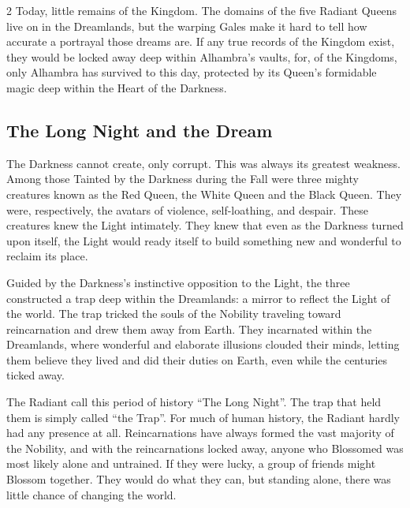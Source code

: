 \begin{multicols}{2}
Today, little remains of the Kingdom. The domains of the five Radiant Queens live on in the Dreamlands, but the warping Gales make it hard to tell how accurate a portrayal those dreams are. If any true records of the Kingdom exist, they would be locked away deep within Alhambra's vaults, for, of the Kingdoms, only Alhambra has survived to this day, protected by its Queen's formidable magic deep within the Heart of the Darkness. 

\subsection*{The Long Night and the Dream}%

The Darkness cannot create, only corrupt. This was always its greatest weakness. Among those Tainted by the Darkness during the Fall were three mighty creatures known as the Red Queen, the White Queen and the Black Queen. They were, respectively, the avatars of violence, self-loathing, and despair. These creatures knew the Light intimately. They knew that even as the Darkness turned upon itself, the Light would ready itself to build something new and wonderful to reclaim its place.

Guided by the Darkness's instinctive opposition to the Light, the three constructed a trap deep within the Dreamlands: a mirror to reflect the Light of the world. The trap tricked the souls of the Nobility traveling toward reincarnation and drew them away from Earth. They incarnated within the Dreamlands, where wonderful and elaborate illusions clouded their minds, letting them believe they lived and did their duties on Earth, even while the centuries ticked away.

The Radiant call this period of history \textquotedblleft The Long Night\textquotedblright. The trap that held them is simply called \textquotedblleft the Trap\textquotedblright. For much of human history, the Radiant hardly had any presence at all. Reincarnations have always formed the vast majority of the Nobility, and with the reincarnations locked away, anyone who Blossomed was most likely alone and untrained. If they were lucky, a group of friends might Blossom together. They would do what they can, but standing alone, there was little chance of changing the world.


\end{multicols}
